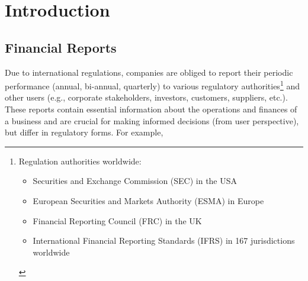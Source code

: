 \section{Introduction}\label{sec:introduction}

\subsection{Financial Reports} \label{subsec:financial_reports}
Due to international regulations, companies are obliged to report their periodic performance (annual, bi-annual, quarterly) to various regulatory authorities\footnote{Regulation authorities worldwide:
    \begin{itemize}
        \item Securities and Exchange Commission (SEC) in the USA
        \item European Securities and Markets Authority (ESMA) in Europe
        \item Financial Reporting Council (FRC) in the UK
        \item International Financial Reporting Standards (IFRS) in 167 jurisdictions worldwide
    \end{itemize}
    } and other users (e.g., corporate stakeholders, investors, customers, suppliers, etc.).
    These reports contain essential information about the operations and finances of a business and are crucial for making informed decisions (from user perspective), but differ in regulatory forms.
    For example,
